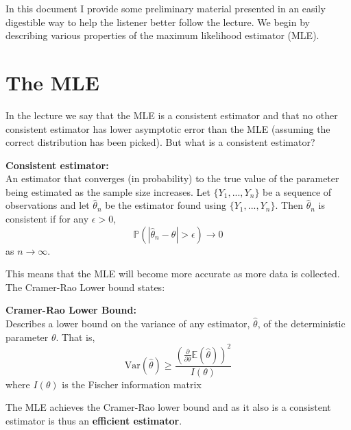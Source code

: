In this document I provide some preliminary material presented in an easily digestible way to help the listener better follow the lecture. We begin by describing various properties of the maximum likelihood estimator (MLE).
\section{The MLE}
In the lecture we say that the MLE is a consistent estimator and that no other consistent estimator has lower asymptotic error than the MLE (assuming the correct distribution has been picked). But what is a consistent estimator?
\begin{definition}
    \textbf{Consistent estimator:} \\
    An estimator that converges (in probability) to the true value of the parameter being estimated as the sample size increases. Let $\{Y_{1},...,Y_{n}\}$ be a sequence of observations and let $\hat{\theta}_{n}$ be the estimator found using $\{Y_{1},...,Y_{n}\}$. Then $\hat{\theta}_{n}$ is consistent if for any $\epsilon>0$,
    \begin{equation}
        \mathbb{P}(|\hat{\theta}_{n} - \theta| > \epsilon) \rightarrow 0
    \end{equation}
    as $n \rightarrow \infty $.
\end{definition} 
This means that the MLE will become more accurate as more data is collected. The Cramer-Rao Lower bound states:
\begin{theorem}
    \textbf{Cramer-Rao Lower Bound:} \\
    Describes a lower bound on the variance of any estimator, $\hat{\theta}$, of the deterministic parameter $\theta$. That is,
    \begin{equation}
        \text{Var}(\hat{\theta}) \geq \frac{(\frac{\partial}{\partial \theta} \mathbb{E}(\hat{\theta}))^{2}}{I(\theta)}
    \end{equation}
    where $I(\theta)$ is the Fischer information matrix
\end{theorem}
The MLE achieves the Cramer-Rao lower bound and as it also is a consistent estimator is thus an \textbf{efficient estimator}. 

